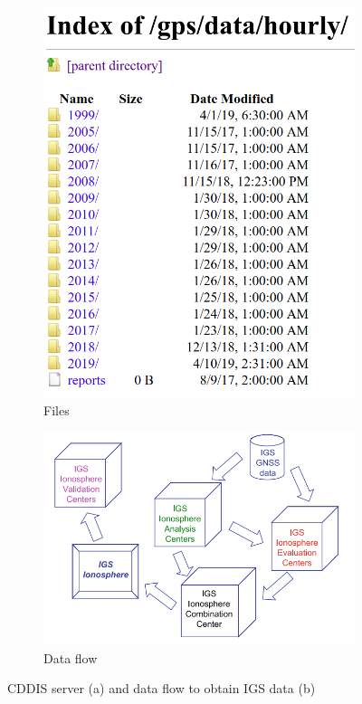 \begin{figure}[!htb]
	\begin{subfigure}[b]{0.3\textwidth}
		\includegraphics[width=\linewidth]{images/ch4/FTPNASA.png}
		\caption{Files}
	\end{subfigure}
	\hfill
	\begin{subfigure}[b]{0.5\textwidth}
		\includegraphics[width=\linewidth]{images/ch4/DataFlowIGS.png}
		\caption{Data flow}
	\end{subfigure}
	\caption{CDDIS server (a) and data flow to obtain IGS data (b)}
	\label{fig:exampleCDDIS}
\end{figure}

